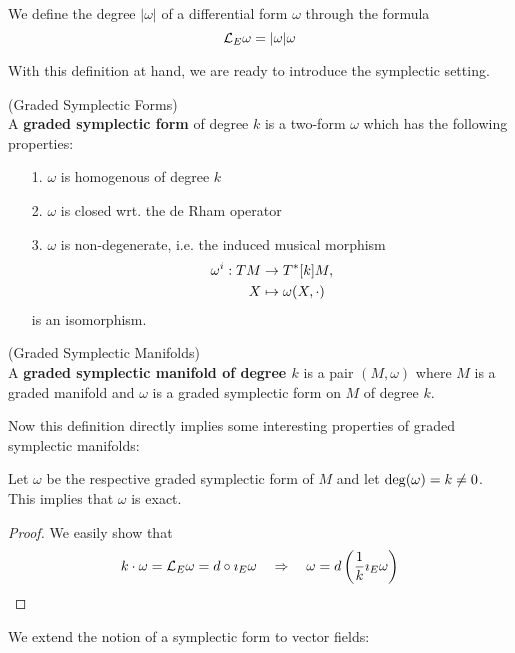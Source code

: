 \begin{definition}
  We define the degree $|\omega|$ of a differential form $\omega$ through the formula
  $$ \mathcal{L}_{E}\omega = |\omega| \omega $$
\end{definition}

With this definition at hand, we are ready to introduce the symplectic setting.

\begin{definition} (Graded Symplectic Forms)\\
  A \textbf{graded symplectic form} of degree $k$ is a two-form $\omega$ which has the following properties:
  \begin{itemize}
    \item[1.] $\omega$ is homogenous of degree $k$
    \item[2.] $\omega$ is closed wrt. the de Rham operator
    \item[3.] $\omega$ is non-degenerate, i.e. the induced musical morphism
    \begin{align*}
      \omega^i : TM &\rightarrow T^*[k]M,\\
      X &\mapsto \omega(X, \cdot)
    \end{align*}
    is an isomorphism.
  \end{itemize}
\end{definition}


\begin{definition} (Graded Symplectic Manifolds)\\
  A \textbf{graded symplectic manifold of degree $k$} is a pair $(M, \omega)$ where $M$ is a graded manifold and $\omega$ is a graded symplectic form on $M$ of degree $k$.
\end{definition}

Now this definition directly implies some interesting properties of graded symplectic manifolds:

\begin{lem}
 Let $\omega$ be the respective graded symplectic form of $M$ and let $\operatorname{deg}(\omega) = k \neq 0$. This implies that $\omega$ is exact.

\begin{proof}
  We easily show that
  $$ k \cdot \omega = \mathcal{L}_{E} \omega = d\circ \imath_E\omega \quad \Rightarrow \quad \omega = d\left( \frac{1}{k} \imath_E \omega \right) $$
\end{proof}
\end{lem}

We extend the notion of a symplectic form to vector fields:


